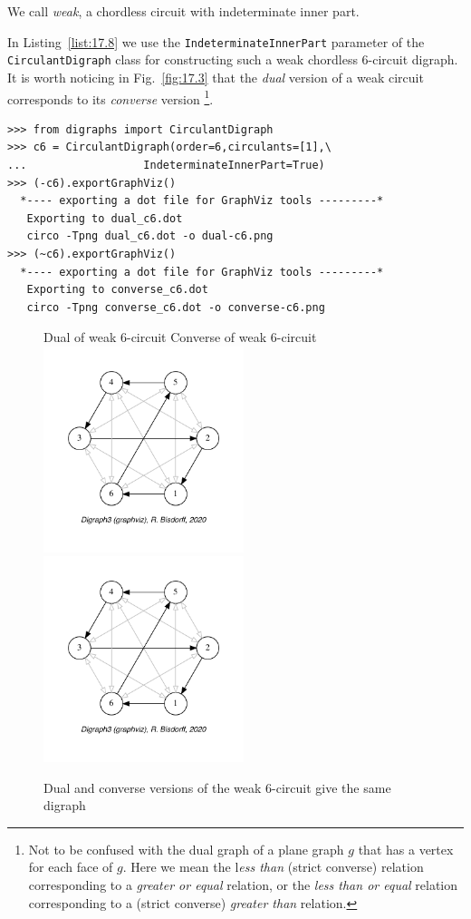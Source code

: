 We call \emph{weak}, a chordless circuit with indeterminate inner part.

In Listing~\vref{list:17.8} we use the \texttt{IndeterminateInnerPart} parameter of the \texttt{Cir\-culantDigraph} class for constructing such a weak chordless 6-circuit digraph. It is worth noticing in Fig.~\vref{fig:17.3} that the \emph{dual} version of a weak circuit corresponds to its \emph{converse} version \footnote{Not to be confused with the dual graph of a plane graph $g$ that has a vertex for each face of $g$. Here we mean the l\emph{ess than} (strict converse) relation corresponding to a \emph{greater or equal} relation, or the \emph{less than or equal} relation corresponding to a (strict converse) \emph{greater than} relation.}.
\begin{lstlisting}[caption={The weak 6-circuit digraph},label=list:17.8]
>>> from digraphs import CirculantDigraph
>>> c6 = CirculantDigraph(order=6,circulants=[1],\
...                  IndeterminateInnerPart=True)
>>> (-c6).exportGraphViz()
  *---- exporting a dot file for GraphViz tools ---------*
   Exporting to dual_c6.dot
   circo -Tpng dual_c6.dot -o dual-c6.png
>>> (~c6).exportGraphViz()
  *---- exporting a dot file for GraphViz tools ---------*
   Exporting to converse_c6.dot
   circo -Tpng converse_c6.dot -o converse-c6.png 
\end{lstlisting}
\begin{figure}[ht]
  Dual of weak 6-circuit \hfill Converse of weak 6-circuit\\
  \includegraphics[height=6cm]{Figures/17-3-dual-c6.pdf}\hfill
  \includegraphics[height=6cm]{Figures/17-3-converse-c6.pdf}
\caption{Dual and converse versions of the weak 6-circuit give the same digraph}
\label{fig:17.3}       %
\end{figure}

